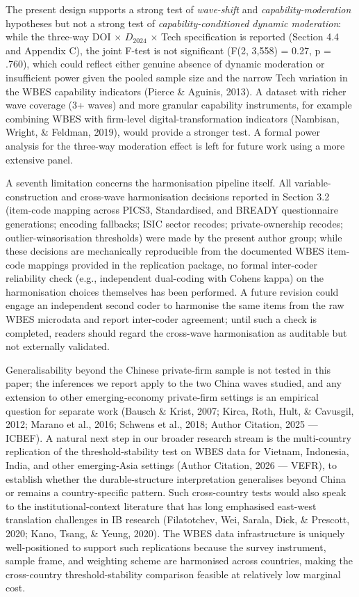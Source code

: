 \documentclass[12pt,a4paper]{article}
\begin{document}
The present design supports a strong test of \emph{wave-shift} and
\emph{capability-moderation} hypotheses but not a strong test of
\emph{capability-conditioned dynamic moderation}: while the three-way
DOI \(\times\) \(D_{2024}\) \(\times\) Tech specification is reported
(Section 4.4 and Appendix C), the joint F-test is not significant (F(2,
3,558) = 0.27, p = .760), which could reflect either genuine absence of
dynamic moderation or insufficient power given the pooled sample size
and the narrow Tech variation in the WBES capability indicators (Pierce
\& Aguinis, 2013). A dataset with richer wave coverage (3+ waves) and
more granular capability instruments, for example combining WBES with
firm-level digital-transformation indicators (Nambisan, Wright, \&
Feldman, 2019), would provide a stronger test. A formal power analysis
for the three-way moderation effect is left for future work using a more
extensive panel.

A seventh limitation concerns the harmonisation pipeline itself. All
variable-construction and cross-wave harmonisation decisions reported in
Section 3.2 (item-code mapping across PICS3, Standardised, and BREADY
questionnaire generations; encoding fallbacks; ISIC sector recodes;
private-ownership recodes; outlier-winsorisation thresholds) were made
by the present author group; while these decisions are mechanically
reproducible from the documented WBES item-code mappings provided in the
replication package, no formal inter-coder reliability check (e.g.,
independent dual-coding with Cohen\textquotesingle s kappa) on the
harmonisation choices themselves has been performed. A future revision
could engage an independent second coder to harmonise the same items
from the raw WBES microdata and report inter-coder agreement; until such
a check is completed, readers should regard the cross-wave harmonisation
as auditable but not externally validated.

Generalisability beyond the Chinese private‑firm sample is not tested in
this paper; the inferences we report apply to the two China waves
studied, and any extension to other emerging‑economy private‑firm
settings is an empirical question for separate work (Bausch \& Krist,
2007; Kirca, Roth, Hult, \& Cavusgil, 2012; Marano et al., 2016; Schwens
et al., 2018; Author Citation, 2025 --- ICBEF). A natural next step in
our broader research stream is the multi-country replication of the
threshold-stability test on WBES data for Vietnam, Indonesia, India, and
other emerging-Asia settings (Author Citation, 2026 --- VEFR), to
establish whether the durable-structure interpretation generalises
beyond China or remains a country-specific pattern. Such cross-country
tests would also speak to the institutional-context literature that has
long emphasised east-west translation challenges in IB research
(Filatotchev, Wei, Sarala, Dick, \& Prescott, 2020; Kano, Tsang, \&
Yeung, 2020). The WBES data infrastructure is uniquely well-positioned
to support such replications because the survey instrument, sample
frame, and weighting scheme are harmonised across countries, making the
cross-country threshold-stability comparison feasible at relatively low
marginal cost.
\end{document}
